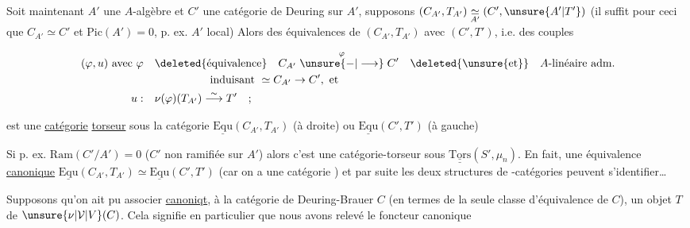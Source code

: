   Soit maintenant $A'$ une $A$-algèbre 
et $C'$ une catégorie de Deuring sur $A'$, 
supposons $(C_{A'},T_{A'})\underset{A'}{\simeq}(C',\unsure{A'|T'})$
(il suffit pour ceci que $C_{A'}\simeq C'$ et $\mathrm{Pic}(A')=0$,
p. ex. $A'$ local) Alors  des équivalences
de $(C_{A'},T_{A'})$ avec $(C',T')$, i.e. des couples

\[
\begin{aligned}
\text{$(\varphi,u)$ avec $\varphi$}\quad &\deleted{\text{équivalence}}\quad C_{A'}\mathrel{\overset{\varphi}{\unsure{-|\longrightarrow}}} C'\quad \deleted{\unsure{\mathrm{et}}}\quad A\text{-linéaire adm.}\\
&\hspace{5em}\text{induisant }\simeq C_{A'}\to C',\text{ et}\\
u:\quad &\nu(\varphi)(T_{A'})\overset{\sim}{\longrightarrow}T'\quad ;
\end{aligned}
\]

est une \uline{catégorie} \uline{torseur} sous la  catégorie
 $\underline{\mathrm{Equ}}(C_{A'},T_{A'})$ (à droite) ou $\underline{\mathrm{Equ}}(C',T')$ (à gauche)

Si p. ex. $\mathrm{Ram}(C'/A')=0$ ($C'$ non ramifiée sur $A'$)
 alors c'est une catégorie-torseur sous
 $\underline{\underline{\mathrm{Tors}}}(S',\mu_n)$. En fait,  une équivalence
\uline{canonique} $\underline{\mathrm{Equ}}(C_{A'},T_{A'})\simeq\underline{\mathrm{Equ}}(C',T')$ (car on a
une  catégorie ) et par suite
les deux structures de -catégories peuvent
s'identifier\ldots


Supposons qu'on ait pu associer \uline{canoniqt},
à la catégorie de Deuring-Brauer $C$ (en termes de
la seule classe d'équivalence de $C$), un objet
$T$ de $\unsure{\nu|\mathcal V|V}(C)$. Cela signifie en particulier que
nous avons relevé le foncteur canonique 


